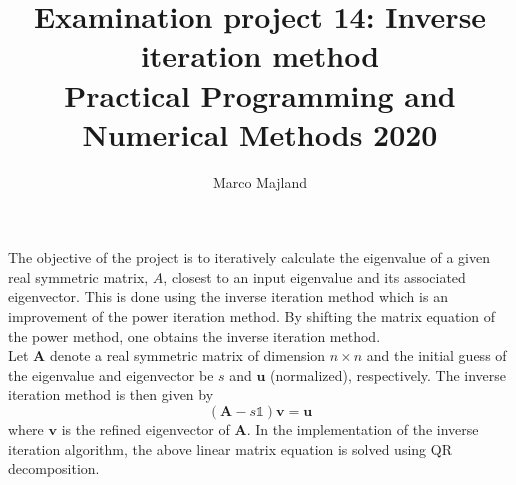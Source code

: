 \documentclass{article}
\title{Examination project 14: Inverse iteration method\\ \small Practical Programming and Numerical Methods 2020}
\author{Marco Majland}
\begin{document}
	\maketitle
	\noindent
	The objective of the project is to iteratively calculate the eigenvalue of a given real symmetric matrix, $A$, closest to an input eigenvalue and its associated eigenvector. This is done using the inverse iteration method which is an improvement of the power iteration method. By shifting the matrix equation of the power method, one obtains the inverse iteration method.\\
	Let $\mathbf{A}$ denote a real  symmetric matrix of dimension $n\times n$ and the initial guess of the eigenvalue and eigenvector be $s$ and $\mathbf{u}$ (normalized), respectively. The inverse iteration method is then given by
	\begin{equation}
		(\mathbf{A} - s\mathbb{1})\mathbf{v} = \mathbf{u}
	\end{equation}
	where $\mathbf{v}$ is the refined eigenvector of $\mathbf{A}$. In the implementation of the inverse iteration algorithm, the above linear matrix equation is solved using QR decomposition.
\end{document}
